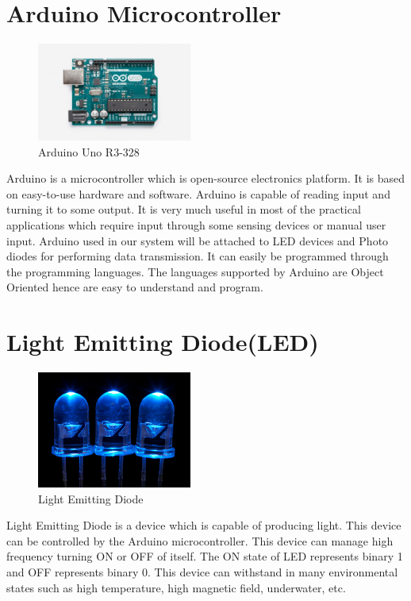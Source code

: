 \documentclass{ijcaArticle}
\begin{document}
\section{Arduino Microcontroller}
\begin{figure}[h]
\centering
\includegraphics[width=2in]{Arduino.jpg}
\caption{Arduino Uno R3-328}
\label{fig:Arduino Uno}
\end{figure}

Arduino is a microcontroller which is open-source electronics platform. It is based on easy-to-use hardware and software.
Arduino is capable of reading input and turning it to some output. It is very much useful in most of the practical applications which require input through some sensing devices or manual user input. Arduino used in our system will be attached to LED devices and Photo diodes for performing data transmission. It can easily be programmed through the programming languages. The languages supported by Arduino are Object Oriented hence are easy to understand and program.


\section{Light Emitting Diode(LED)}
\label{sec:additional_faci}

\begin{figure}[h]
\centering
\includegraphics[width=2in]{LED.jpg}
\caption{Light Emitting Diode}
\label{fig:Light Emitting Diode}
\end{figure}
Light Emitting Diode is a device which is capable of producing light. This device can be controlled by the Arduino microcontroller. This device can manage high frequency turning ON or  OFF of itself. The ON state of LED represents binary 1 and OFF represents binary 0. This device can withstand in many environmental states such as high temperature, high magnetic field, underwater, etc.
\end{document}
